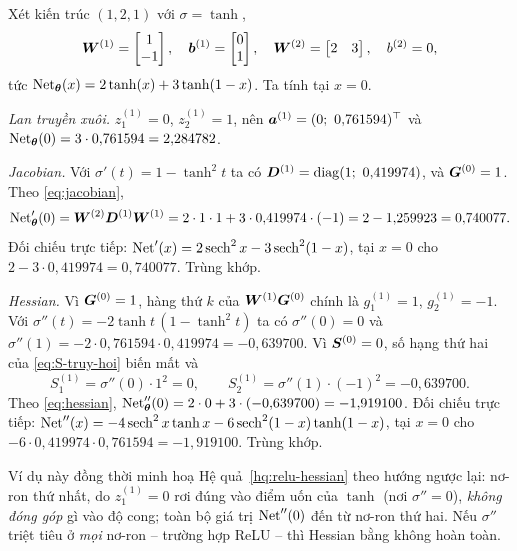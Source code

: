 \begin{vidu}
\label{vd:dao-ham}
Xét kiến trúc $(1,2,1)$ với $\sigma = \tanh$,
\[
\bm{W}^{(1)} = \begin{bmatrix} 1 \\ -1 \end{bmatrix},
\quad
\bm{b}^{(1)} = \begin{bmatrix} 0 \\ 1 \end{bmatrix},
\quad
\bm{W}^{(2)} = \begin{bmatrix} 2 & 3 \end{bmatrix},
\quad
b^{(2)} = 0,
\]
tức $\operatorname{Net}_{\bm{\theta}}(x) = 2\tanh(x) + 3\tanh(1-x)$. Ta tính tại $x = 0$.
 
\emph{Lan truyền xuôi.} $z^{(1)}_1 = 0$, $z^{(1)}_2 = 1$, nên
$\ba^{(1)} = (0;\ 0{,}761594)^{\top}$ và
$\operatorname{Net}_{\bm{\theta}}(0) = 3\cdot 0{,}761594 = 2{,}284782$.
 
\emph{Jacobian.} Với $\sigma'(t) = 1 - \tanh^2 t$ ta có
$\bD^{(1)} = \diag(1;\ 0{,}419974)$, và $\bm{G}^{(0)} = 1$. Theo
\eqref{eq:jacobian},
\[
\operatorname{Net}'_{\bm{\theta}}(0) = \bm{W}^{(2)}\bm{D}^{(1)}\bm{W}^{(1)}
 = 2\cdot 1\cdot 1 + 3\cdot 0{,}419974\cdot(-1)
 = 2 - 1{,}259923 = 0{,}740077 .
\]
Đối chiếu trực tiếp: $\operatorname{Net}'(x) = 2\operatorname{sech}^2 x - 3\operatorname{sech}^2(1-x)$, tại $x=0$ cho $2 - 3\cdot 0{,}419974 = 0{,}740077$. Trùng khớp.
 
\emph{Hessian.} Vì $\bm{G}^{(0)} = 1$, hàng thứ $k$ của $\bm{W}^{(1)}\bm{G}^{(0)}$ chính
là $g^{(1)}_1 = 1$, $g^{(1)}_2 = -1$. Với
$\sigma''(t) = -2\tanh t\,(1-\tanh^2 t)$ ta có $\sigma''(0) = 0$ và
$\sigma''(1) = -2\cdot 0{,}761594\cdot 0{,}419974 = -0{,}639700$. Vì
$\bm{S}^{(0)} = 0$, số hạng thứ hai của \eqref{eq:S-truy-hoi} biến mất và
\[
S^{(1)}_1 = \sigma''(0)\cdot 1^2 = 0,
\qquad
S^{(1)}_2 = \sigma''(1)\cdot(-1)^2 = -0{,}639700 .
\]
Theo \eqref{eq:hessian},
$\operatorname{Net}''_{\bm{\theta}}(0) = 2\cdot 0 + 3\cdot(-0{,}639700) = -1{,}919100$.
Đối chiếu trực tiếp:
$\operatorname{Net}''(x) = -4\operatorname{sech}^2 x\tanh x - 6\operatorname{sech}^2(1-x)\tanh(1-x)$, tại $x = 0$ cho $-6\cdot 0{,}419974\cdot 0{,}761594 = -1{,}919100$. Trùng khớp.
 
Ví dụ này đồng thời minh hoạ Hệ quả~\ref{hq:relu-hessian} theo hướng ngược lại:
nơ-ron thứ nhất, do $z^{(1)}_1 = 0$ rơi đúng vào điểm uốn của $\tanh$ (nơi
$\sigma'' = 0$), \emph{không đóng góp} gì vào độ cong; toàn bộ giá trị
$\operatorname{Net}''(0)$ đến từ nơ-ron thứ hai. Nếu $\sigma''$ triệt tiêu ở \emph{mọi} nơ-ron
-- trường hợp ReLU -- thì Hessian bằng không hoàn toàn.
\end{vidu}
 
